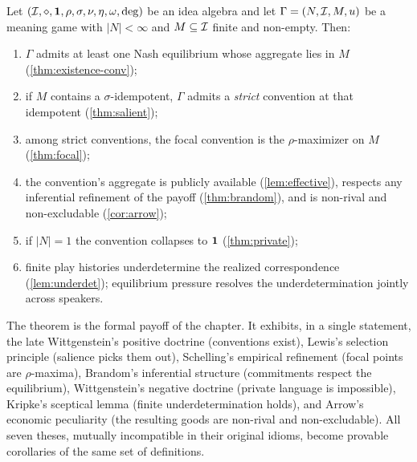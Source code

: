 \begin{theorem}\label{thm:bridge}
Let $(\mathcal{I},\mathbin{\diamond},\mathbf{1},\rho,\sigma,\nu,\eta,\omega,\deg)$ be an
idea algebra and let $\Gamma=(N,\mathcal{I},M,u)$ be a meaning game with
$|N|<\infty$ and $M\subseteq\mathcal{I}$ finite and non-empty. Then:
\begin{enumerate}[leftmargin=2em]
  \item $\Gamma$ admits at least one Nash equilibrium whose aggregate
    lies in $M$ (\cref{thm:existence-conv});
  \item if $M$ contains a $\sigma$-idempotent, $\Gamma$ admits a
    \emph{strict} convention at that idempotent (\cref{thm:salient});
  \item among strict conventions, the focal convention is the
    $\rho$-maximizer on $M$ (\cref{thm:focal});
  \item the convention's aggregate is publicly available
    (\cref{lem:effective}), respects any inferential refinement of the
    payoff (\cref{thm:brandom}), and is non-rival and non-excludable
    (\cref{cor:arrow});
  \item if $|N|=1$ the convention collapses to $\mathbf{1}$
    (\cref{thm:private});
  \item finite play histories underdetermine the realized
    correspondence (\cref{lem:underdet}); equilibrium pressure
    resolves the underdetermination jointly across speakers.
\end{enumerate}
\end{theorem}

The theorem is the formal payoff of the chapter. It exhibits, in a
single statement, the late Wittgenstein's positive doctrine
(conventions exist), Lewis's selection principle (salience picks them
out), Schelling's empirical refinement (focal points are
$\rho$-maxima), Brandom's inferential structure (commitments respect
the equilibrium), Wittgenstein's negative doctrine (private language
is impossible), Kripke's sceptical lemma (finite underdetermination
holds), and Arrow's economic peculiarity (the resulting goods are
non-rival and non-excludable). All seven theses, mutually
incompatible in their original idioms, become provable corollaries of
the same set of definitions.


